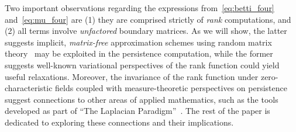 \documentclass[10pt]{article}
\numberwithin{equation}{section}
\newcommand{\+}{%
	\raisebox{0.18ex}{\scaleobj{0.55}{+}}
}
\theoremstyle{definition}
\theoremstyle{definition}
\begin{document}
Two important observations regarding the expressions from~\eqref{eq:betti_four} and~\eqref{eq:mu_four} are (1) they are comprised strictly of \emph{rank} computations, and (2) all terms involve \emph{unfactored} boundary matrices.
As we will show, the latter suggests implicit, \emph{matrix-free} approximation schemes using random matrix theory~\cite{chen2011output} may be exploited in the persistence computation, while the former suggests well-known variational perspectives of the rank function could yield useful relaxations. 
Moreover, the invariance of the rank function under zero-characteristic fields coupled with measure-theoretic perspectives on persistence~\cite{chazal2016structure} suggest connections to other areas of applied mathematics, such as the tools developed as part of ``The Laplacian Paradigm''~\cite{}.
The rest of the paper is dedicated to exploring these connections and their implications. 
\end{document}
